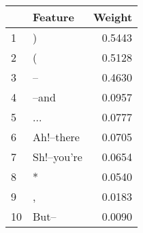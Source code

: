 \begin{tabular}{llr}
\toprule
{} &      Feature &  Weight \\
\midrule
1  &            ) &  0.5443 \\
2  &            ( &  0.5128 \\
3  &           -- &  0.4630 \\
4  &        --and &  0.0957 \\
5  &          ... &  0.0777 \\
6  &   Ah!--there &  0.0705 \\
7  &  Sh!--you're &  0.0654 \\
8  &            * &  0.0540 \\
9  &            , &  0.0183 \\
10 &        But-- &  0.0090 \\
\bottomrule
\end{tabular}

